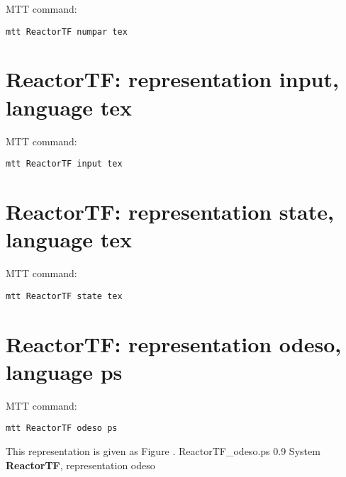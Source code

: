 MTT command:
\begin{verbatim}
mtt ReactorTF numpar tex 
\end{verbatim}
  


\section{\textbf{ReactorTF}: representation \textbf{input}, language \textbf{tex}}
\label{sec:ReactorTF_input.tex}


MTT command:
\begin{verbatim}
mtt ReactorTF input tex 
\end{verbatim}
  


\section{\textbf{ReactorTF}: representation \textbf{state}, language \textbf{tex}}
\label{sec:ReactorTF_state.tex}


MTT command:
\begin{verbatim}
mtt ReactorTF state tex 
\end{verbatim}
  


\section{\textbf{ReactorTF}: representation \textbf{odeso}, language \textbf{ps}}
\label{sec:ReactorTF_odeso.ps}


MTT command:
\begin{verbatim}
mtt ReactorTF odeso ps 
\end{verbatim}
This representation is given as Figure .
    {ReactorTF_odeso.ps}
    {0.9}
    {System \textbf{ReactorTF}, representation odeso}
